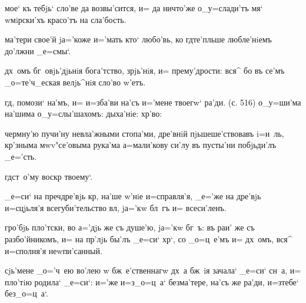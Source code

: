 

 мое` къ тебjь` сло'ве да возвы'сится, и= 
да ничто'же о_у=слади'тъ мя` w\т мiрски'хъ красо'тъ на 
сла'бость.

 ма'тери свое'й jа='коже и='мать кто` любо'вь, 
ко гд те'пльше любле'нiемъ до'лжни _е=смы`.

  дх~омъ бг~овjь'дjьнiя бога'тство, 
зрjь'нiя, и= прему'дрости: вся^ бо въ се'мъ _о=те'ч_еская 
велjь^нiя сло'во w'етъ.


    гд, помози` 
на'мъ, и= и=зба'ви на'съ и='мене твоегw` ра'ди. (с. 516) 
  о_у=ши'ма на'шима о_у=слы'шахомъ: 
 дыха'нiе:    
хр'во: 



 чермну'ю пучи'ну невла'жными 
стопа'ми, дре'внiй пjьшеше'ствовавъ i=и~ль, 
кр'зныма мwv"се'овыма рука'ма а=мали'кову си'лу 
въ пусты'ни побjьди'лъ _е='сть.

  гд ст~о'му воскр 
твоему`.

 _е=си` на преч дре'вjь 
кр, на'ше w'нiе и=справля'я, _е='же на 
дре'вjь и=сцjьля'я всегуби'тельство вл, jа='кw бл~гъ 
и= всеси'ленъ.

 гро'бjь пло'тски, во а='дjь же съ душе'ю, 
jа='кw бг~ъ: въ раи' же съ разбо'йникомъ, и= на 
пр'лjь бы'лъ _е=си` хр`, со _о=ц~е'мъ и= дх~омъ, 
вся^ и=сполня'я неwпи'санный.

  сjь'мене _о='ч~ею во'лею w\т 
бж~е'ственнагw дх~а бж~iя зачала` _е=си` сн~а, и= пло'тiю 
родила` _е=си`: и='же и=з\ъ _о=ц~а` без\ъ ма'тере, на'съ 
же ра'ди, и=з\ъ тебе` без\ъ _о=ц~а`.



